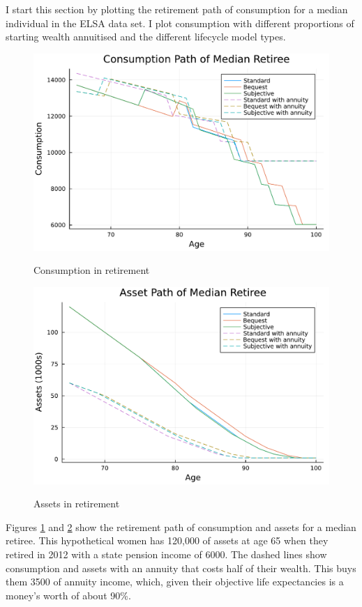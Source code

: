 \documentclass[12pt]{article}
\begin{document}
I start this section by plotting the retirement path of consumption for a median individual in
the ELSA data set. I plot consumption with different proportions of starting wealth annuitised
and the different lifecycle model types.

\begin{figure}[h]
    \caption{Consumption in retirement}
    \centering
    \includegraphics[width=0.7\columnwidth]{figures/consumption_plot_median_retiree.pdf}
    \label{fig:ConsumpPlot}
\end{figure}


\begin{figure}[h]
    \caption{Assets in retirement}
    \centering
    \includegraphics[width=0.7\columnwidth]{figures/asset_plot_median_retiree.pdf}
    \label{fig:AssetPlot}
\end{figure}

Figures \ref{fig:ConsumpPlot} and \ref{fig:AssetPlot} show the retirement
path of consumption and assets for a median retiree. This hypothetical women has
120,000 of assets at age 65 when they retired in 2012 with a state pension income of 6000.
The dashed lines show consumption and assets with an annuity that costs half of their wealth.
This buys them 3500 of annuity income, which, given their objective life expectancies is a money's
worth of about 90\%.
\end{document}
